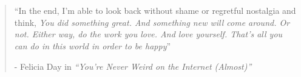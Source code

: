 \chapter*{}

\vspace*{\fill} 
\begin{quote} 
``In the end, I'm able to look back without shame or regretful nostalgia and think, \textit{You did something great. And something new will come around. Or not. Either way, do the work you love. And love yourself. That's all you can do in this world in order to be happy}'' 

\begin{flushright}
- Felicia Day in \textit{``You're Never Weird on the Internet (Almost)''}
\end{flushright}
\end{quote}
\vspace*{\fill}
